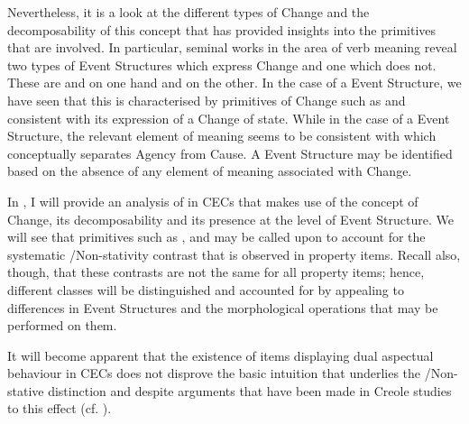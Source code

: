 Nevertheless, it is a look at the different types of Change and the
decomposability of this concept that has provided insights into the
primitives that are involved.  In particular, seminal works in the
area of verb meaning reveal two types of Event Structures which
express Change and one which does not.  These are  and
 on one hand and  on the other.  In the case of a
 Event Structure, we have seen that this is characterised by
primitives of Change such as \CAUSE and \BECOME consistent with its
expression of a Change of state. While in the case of a  Event
Structure, the relevant element of meaning seems to be consistent with
\DO which conceptually separates Agency from Cause.  A  Event
Structure may be identified based on the absence of any element of
meaning associated with Change.

In , I will provide an analysis of  in
CECs that makes use of the concept of Change, its decomposability and
its presence at the level of Event Structure.  We will see that
primitives such as \CAUSE, \BECOME and \DO may be called upon to account
for the systematic \slash Non-stativity contrast that is observed
in property items.  Recall also, though, that these contrasts are not
the same for all property items; hence, different classes will be
distinguished and accounted for by appealing to differences in Event
Structures and the morphological operations that may be performed on
them.

It will become apparent that the existence of items displaying dual
aspectual behaviour in CECs does not disprove the basic intuition that
underlies the \slash Non-stative distinction and 
despite arguments that have been made in Creole studies to this effect
(cf. \citealt{Jaganauth1987}).
